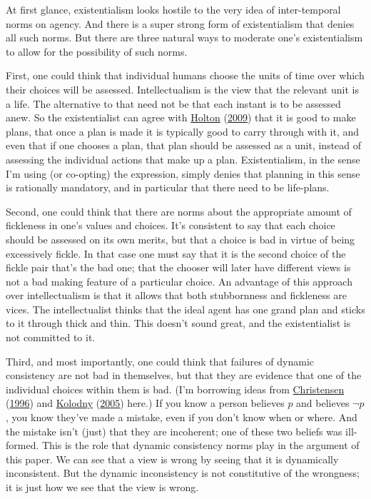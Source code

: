 \documentclass[
  12pt,
]{article}
\begin{document}
At first glance, existentialism looks hostile to the very idea of
inter-temporal norms on agency. And there is a super strong form of
existentialism that denies all such norms. But there are three natural
ways to moderate one's existentialism to allow for the possibility of
such norms.

First, one could think that individual humans choose the units of time
over which their choices will be assessed. Intellectualism is the view
that the relevant unit is a life. The alternative to that need not be
that each instant is to be assessed anew. So the existentialist can
agree with \protect\hyperlink{ref-Holton2009}{Holton}
(\protect\hyperlink{ref-Holton2009}{2009}) that it is good to make
plans, that once a plan is made it is typically good to carry through
with it, and even that if one chooses a plan, that plan should be
assessed as a unit, instead of assessing the individual actions that
make up a plan. Existentialism, in the sense I'm using (or co-opting)
the expression, simply denies that planning in this sense is rationally
mandatory, and in particular that there need to be life-plans.

Second, one could think that there are norms about the appropriate
amount of fickleness in one's values and choices. It's consistent to say
that each choice should be assessed on its own merits, but that a choice
is bad in virtue of being excessively fickle. In that case one must say
that it is the second choice of the fickle pair that's the bad one; that
the chooser will later have different views is not a bad making feature
of a particular choice. An advantage of this approach over
intellectualism is that it allows that both stubbornness and fickleness
are vices. The intellectualist thinks that the ideal agent has one grand
plan and sticks to it through thick and thin. This doesn't sound great,
and the existentialist is not committed to it.

Third, and most importantly, one could think that failures of dynamic
consistency are not bad in themselves, but that they are evidence that
one of the individual choices within them is bad. (I'm borrowing ideas
from \protect\hyperlink{ref-Christensen1996}{Christensen}
(\protect\hyperlink{ref-Christensen1996}{1996}) and
\protect\hyperlink{ref-Kolodny2005}{Kolodny}
(\protect\hyperlink{ref-Kolodny2005}{2005}) here.) If you know a person
believes \(p\) and believes \(\neg p\), you know they've made a mistake,
even if you don't know when or where. And the mistake isn't (just) that
they are incoherent; one of these two beliefs was ill-formed. This is
the role that dynamic consistency norms play in the argument of this
paper. We can see that a view is wrong by seeing that it is dynamically
inconsistent. But the dynamic inconsistency is not constitutive of the
wrongness; it is just how we see that the view is wrong.
\end{document}
